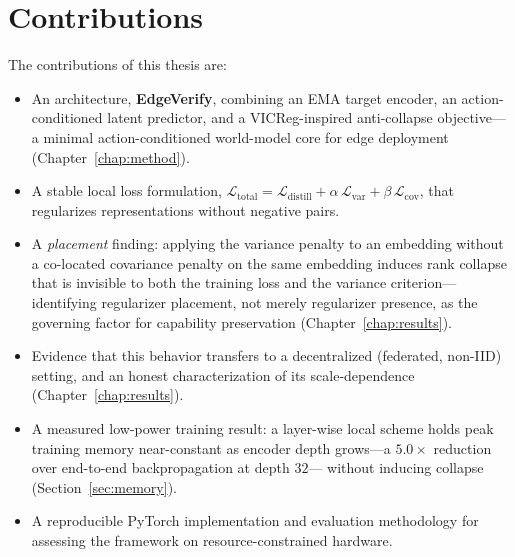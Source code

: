 \section{Contributions}
The contributions of this thesis are:
\begin{itemize}
    \item An architecture, \textbf{EdgeVerify}, combining an EMA target
    encoder, an action-conditioned latent predictor, and a
    VICReg-inspired anti-collapse objective---a minimal action-conditioned
    world-model core for edge deployment (Chapter~\ref{chap:method}).
    \item A stable local loss formulation,
    $\mathcal{L}_{\text{total}} = \mathcal{L}_{\text{distill}}
    + \alpha\,\mathcal{L}_{\text{var}} + \beta\,\mathcal{L}_{\text{cov}}$,
    that regularizes representations without negative pairs.
    \item A \emph{placement} finding: applying the variance penalty to an
    embedding without a co-located covariance penalty on the same embedding
    induces rank collapse that is invisible to both the training loss and
    the variance criterion---identifying regularizer placement, not merely
    regularizer presence, as the governing factor for capability
    preservation (Chapter~\ref{chap:results}).
    \item Evidence that this behavior transfers to a decentralized
    (federated, non-IID) setting, and an honest characterization of its
    scale-dependence (Chapter~\ref{chap:results}).
    \item A measured low-power training result: a layer-wise local scheme
    holds peak training memory near-constant as encoder depth grows---a
    $5.0\times$ reduction over end-to-end backpropagation at depth $32$---%
    without inducing collapse (Section~\ref{sec:memory}).
    \item A reproducible PyTorch implementation and evaluation methodology
    for assessing the framework on resource-constrained hardware.
\end{itemize}

